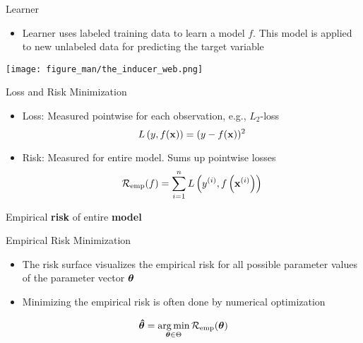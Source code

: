\documentclass[11pt,compress,t,notes=noshow, xcolor=table]{beamer}
\begin{document}
\begin{frame}{Learner}
\begin{itemize}
\item Learner uses labeled training data to learn a model $f$. This model is applied to new unlabeled data for predicting the target variable
\end{itemize}
 \begin{center}
    \texttt{[image: figure\_man/the\_inducer\_web.png]}
  \end{center}
\end{frame}


\begin{frame}{Loss and Risk Minimization}
\begin{itemize}
  \item Loss: Measured pointwise for each observation, e.g., $L_2$-loss
  $$
  L\left(y, f(\mathbf{x})\right) = (y - f(\mathbf{x}))^2
  $$
  \item Risk: Measured for entire model. Sums up pointwise losses
  $$
  \mathcal{R}_{\text{emp}}(f) = \sum\limits_{i=1}^n L\left(y^{(i)}, f\left(\mathbf{x}^{(i)}\right)\right)
  $$
\end{itemize}
\vfill
{}
{
\center \small Empirical \textbf{risk} of entire \textbf{model}
}
\end{frame}


\begin{frame2}[small]{Empirical Risk Minimization}
\begin{itemize}
\item The risk surface visualizes the empirical risk for all possible parameter values of the parameter vector $\bm{\theta}$
\item Minimizing the empirical risk is often done by numerical optimization
\end{itemize}
$$
\bm{\hat\theta} = \mathop{\mathrm{arg\,min}}_{\bm{\theta} \in \Theta} \mathcal{R}_{\text{emp}}(\bm{\theta})
$$
\end{frame2}

\endlecture
\end{document}
